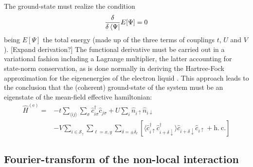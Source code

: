 The ground-state must realize the condition
\[
	\fdv{}{\bra{\Psi}} E[\Psi] = 0
\]
being $E[\Psi]$ the total energy (made up of the three terms of couplings $t$, $U$ and $V$). {\color{tabred}[Expand derivation?]} The functional derivative must be carried out in a variational fashion including a Lagrange multiplier, the latter accounting for state-norm conservation, as is done normally in deriving the Hartree-Fock approximation for the eigenenergies of the electron liquid \cite{grosso2014solid, giuliani2005quantum}. This approach leads to the conclusion that the (coherent) ground-state of the system must be an eigenstate of the mean-field effective hamiltonian:
\begin{align}\label{eq:extended-hubbard-model-effective}
	\hat H^{(\mathrm{e})} =
	&-t \sum_{\langle ij \rangle} \sum_\sigma \hat c_{i\sigma}^\dagger \hat c_{j\sigma}
	+ U \sum_i \hat n_{i\uparrow} \hat n_{i\downarrow} \\
	&- V \sum_{i \in \mathcal{S}_\uparrow} \sum_{\ell = x,y} \sum_{\delta = \pm \delta_\ell} \left[
		\langle 
			\hat c_{i\uparrow}^\dagger \hat c_{i + \delta \downarrow}^\dagger
		\rangle
		\hat c_{i + \delta \downarrow} \hat c_{i\uparrow} 
		+ \mathrm{h}.~\mathrm{c}.
	\right]
\end{align}
\todo

\subsection{Fourier-transform of the non-local interaction}

